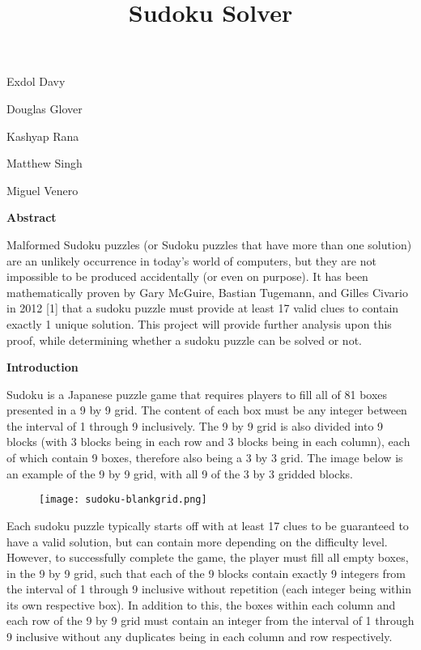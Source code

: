 \documentclass[11pt]{article}
\title{Sudoku Solver}
\begin{document}
\maketitle

\vspace{2\baselineskip}
Exdol Davy

Douglas Glover

Kashyap Rana

Matthew Singh

Miguel Venero

\vspace{1\baselineskip}

\begin{center}
{\Large\textbf{Abstract}}
\end{center}

\vspace{1\baselineskip}
Malformed Sudoku puzzles (or Sudoku puzzles that have more than one solution) are an unlikely occurrence in today's world of computers, but they are not impossible to be produced accidentally (or even on purpose). It has been mathematically proven by Gary McGuire, Bastian Tugemann, and Gilles Civario in 2012 [1] that a sudoku puzzle must provide at least 17 valid clues to contain exactly 1 unique solution. This project will provide further analysis upon this proof, while determining whether a sudoku puzzle can be solved or not.

\begin{center}
{\Large\textbf{Introduction}}
\end{center}

\vspace{1\baselineskip}
Sudoku is a Japanese puzzle game that requires players to fill all of 81 boxes presented in a 9 by 9 grid. The content of each box must be any integer between the interval of 1 through 9 inclusively. The 9 by 9 grid is also divided into 9 blocks (with 3 blocks being in each row and 3 blocks being in each column), each of which contain 9 boxes, therefore also being a 3 by 3 grid. The image below is an example of the 9 by 9 grid, with all 9 of the 3 by 3 gridded blocks.

\vspace{1\baselineskip}
\begin{figure}[H]
\centering
\texttt{[image: sudoku-blankgrid.png]}
\end{figure}

\vspace{1\baselineskip}
Each sudoku puzzle typically starts off with at least 17 clues to be guaranteed to have a valid solution, but can contain more depending on the difficulty level. However, to successfully complete the game, the player must fill all empty boxes, in the 9 by 9 grid, such that each of the 9 blocks contain exactly 9 integers from the interval of 1 through 9 inclusive without repetition (each integer being within its own respective box). In addition to this, the boxes within each column and each row of the 9 by 9 grid must contain an integer from the interval of 1 through 9 inclusive without any duplicates being in each column and row respectively. 
\end{document}
